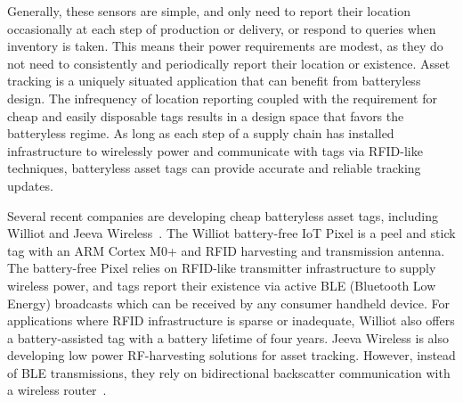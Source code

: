 Generally, these sensors are simple, and only need to report their location occasionally at each step of production or delivery, or respond to queries when inventory is taken.
This means their power requirements are modest, as
they do not need to consistently and periodically report their location or existence.
Asset tracking is a uniquely situated application that can benefit from batteryless design.
The infrequency of location reporting coupled with the requirement for cheap and easily disposable tags results in a design space that favors the batteryless regime.
As long as each step of a supply chain has installed infrastructure to wirelessly power and communicate with tags via RFID-like techniques, batteryless asset tags can provide accurate and reliable tracking updates.

Several recent companies are developing cheap batteryless asset tags, including Williot and Jeeva Wireless~\cite{williotpixel,jeevawireless}.
The Williot battery-free IoT Pixel is a peel and stick tag with an ARM Cortex M0+ and RFID harvesting and transmission antenna.
The battery-free Pixel relies on RFID-like transmitter infrastructure to supply wireless power, and tags report their existence via active BLE (Bluetooth Low Energy) broadcasts which can be received by any consumer handheld device.
For applications where RFID infrastructure is sparse or inadequate, Williot also offers a battery-assisted tag with a battery lifetime of four years.
Jeeva Wireless is also developing low power RF-harvesting solutions for asset tracking. However, instead of BLE transmissions, they rely on bidirectional backscatter communication with a wireless router~\cite{jeevawireless}.

